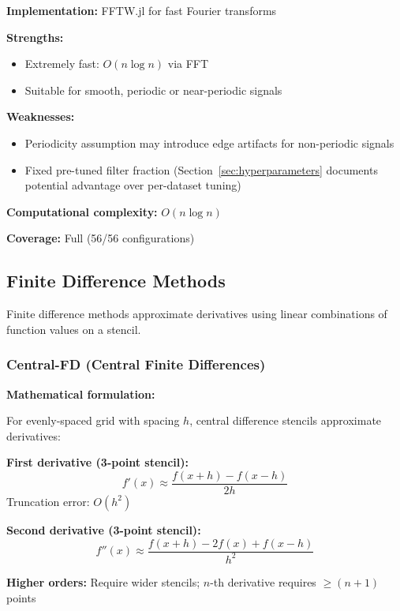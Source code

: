 \textbf{Implementation:} FFTW.jl for fast Fourier transforms

\textbf{Strengths:}
\begin{itemize}
    \item Extremely fast: $O(n \log n)$ via FFT
    \item Suitable for smooth, periodic or near-periodic signals
\end{itemize}

\textbf{Weaknesses:}
\begin{itemize}
    \item Periodicity assumption may introduce edge artifacts for non-periodic signals
    \item Fixed pre-tuned filter fraction (Section~\ref{sec:hyperparameters} documents potential advantage over per-dataset tuning)
\end{itemize}

\textbf{Computational complexity:} $O(n \log n)$

\textbf{Coverage:} Full (56/56 configurations)

\subsection{Finite Difference Methods}
\label{sec:fd_methods}

Finite difference methods approximate derivatives using linear combinations of function values on a stencil.

\subsubsection{Central-FD (Central Finite Differences)}

\textbf{Mathematical formulation:}

For evenly-spaced grid with spacing $h$, central difference stencils approximate derivatives:

\textbf{First derivative (3-point stencil):}
\begin{equation}
f'(x) \approx \frac{f(x+h) - f(x-h)}{2h}
\end{equation}
Truncation error: $O(h^2)$

\textbf{Second derivative (3-point stencil):}
\begin{equation}
f''(x) \approx \frac{f(x+h) - 2f(x) + f(x-h)}{h^2}
\end{equation}

\textbf{Higher orders:} Require wider stencils; $n$-th derivative requires $\geq (n+1)$ points

